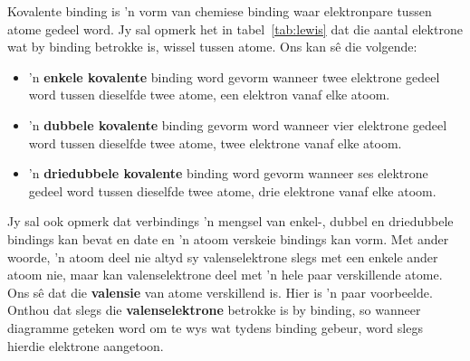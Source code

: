 
\label{m38704*fhsst!!!underscore!!!id94}
 {Kovalente binding is 'n vorm van chemiese binding waar elektronpare tussen atome gedeel word.} 
\label{m38704*id139505}Jy sal opmerk het in tabel~\ref{tab:lewis} dat die aantal elektrone wat by binding betrokke is, wissel tussen atome. Ons kan s\^{e} die volgende:
\begin{itemize}
 \item 'n \textbf{enkele kovalente} binding word gevorm wanneer twee elektrone gedeel word tussen dieselfde twee atome, een elektron vanaf elke atoom. 
 \item 'n \textbf{dubbele kovalente} binding gevorm word wanneer vier elektrone gedeel word tussen dieselfde twee atome, twee elektrone vanaf elke atoom.
 \item 'n \textbf{driedubbele kovalente} binding word gevorm wanneer ses elektrone gedeel word tussen dieselfde twee atome, drie elektrone vanaf elke atoom.
\end{itemize}
Jy sal ook opmerk dat verbindings 'n mengsel van enkel-, dubbel en driedubbele bindings kan bevat en date en  'n atoom verskeie bindings kan vorm. Met ander woorde, 'n atoom deel nie altyd sy valenselektrone slegs met een enkele ander atoom nie, maar kan valenselektrone deel met  'n hele paar verskillende atome.\\
Ons s\^{e} dat die \textbf{valensie} van atome verskillend is. 
\label{m38704*id138991}Hier is 'n paar voorbeelde. Onthou dat slegs die \textbf{valenselektrone} betrokke is by binding, so wanneer diagramme geteken word om te wys wat tydens binding gebeur, word slegs hierdie elektrone aangetoon. \par 
\label{m38704*secfhsst!!!underscore!!!id98} 
